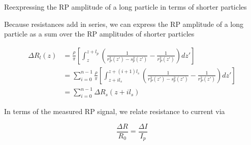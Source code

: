 \begin{frame}[c]{Reexpressing the RP amplitude of a long particle in terms of shorter particles}
	
	
	{\footnotesize
	Because resistances add in series, we can express the RP amplitude of a long particle as a sum over the RP amplitudes of shorter particles
	}
	
	
	{\scriptsize
		\begin{equation*}
			\begin{split}
				\Delta R_{l}\left(z\right) &= \frac{\rho}{\pi}\left[\int_{z}^{z+l_{p}}\left(\frac{1}{r_{P}^{2}\left(z'\right)-s_{p}^{2}\left(z'\right)}-\frac{1}{r_{P}^{2}\left(z'\right)}\right)dz'\right] \\
				&= \sum_{i=0}^{n-1}\frac{\rho}{\pi}\left[\int_{z+il_{s}}^{z+\left(i+1\right)l_{s}}\left(\frac{1}{r^{2}_{P}\left(z'\right)-s^{2}_{p}\left(z'\right)}-\frac{1}{r_{P}^{2}\left(z'\right)}\right)dz'\right] \\
				&= \sum_{i=0}^{n-1}\Delta R_{s}\left(z+il_{s}\right)
			\end{split}
		\end{equation*}
	}
		
	{\footnotesize In terms of the measured RP signal, we relate resistance to current via }
		
	{\scriptsize \[ \frac{\Delta R}{R_{0}}=\frac{\Delta I}{I_{p}} \]}
	


		



\end{frame}





